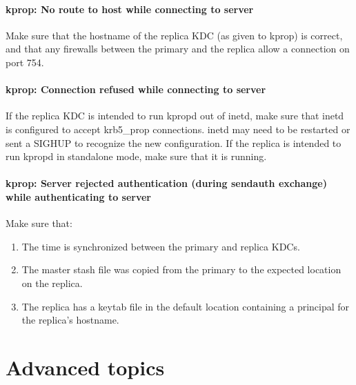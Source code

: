 \documentclass[letterpaper,10pt,english]{sphinxmanual}
\begin{document}
\subsubsection{kprop: No route to host while connecting to server}
\label{\detokenize{admin/troubleshoot:kprop-no-route}}\label{\detokenize{admin/troubleshoot:kprop-no-route-to-host-while-connecting-to-server}}
Make sure that the hostname of the replica KDC (as given to kprop) is
correct, and that any firewalls between the primary and the replica
allow a connection on port 754.


\subsubsection{kprop: Connection refused while connecting to server}
\label{\detokenize{admin/troubleshoot:kprop-connection-refused-while-connecting-to-server}}\label{\detokenize{admin/troubleshoot:kprop-con-refused}}
If the replica KDC is intended to run kpropd out of inetd, make sure
that inetd is configured to accept krb5\_prop connections.  inetd may
need to be restarted or sent a SIGHUP to recognize the new
configuration.  If the replica is intended to run kpropd in standalone
mode, make sure that it is running.


\subsubsection{kprop: Server rejected authentication (during sendauth exchange) while authenticating to server}
\label{\detokenize{admin/troubleshoot:kprop-sendauth-exchange}}\label{\detokenize{admin/troubleshoot:kprop-server-rejected-authentication-during-sendauth-exchange-while-authenticating-to-server}}
Make sure that:
\begin{enumerate}
\item {} 
The time is synchronized between the primary and replica KDCs.

\item {} 
The master stash file was copied from the primary to the expected
location on the replica.

\item {} 
The replica has a keytab file in the default location containing a
 principal for the replica’s hostname.

\end{enumerate}


\chapter{Advanced topics}
\label{\detokenize{admin/advanced/index:advanced-topics}}\label{\detokenize{admin/advanced/index::doc}}
\end{document}
